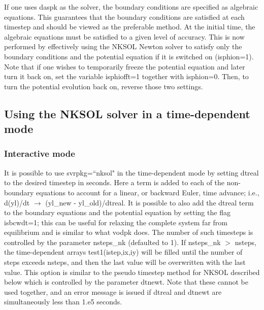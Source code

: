 \documentclass [12pt]{article}
\begin{document}
If one uses daspk as the solver, the boundary conditions are specified as
algebraic equations.  This guarantees that the boundary conditions are
satisfied at each timestep and should be viewed as the preferable method.
At the initial time, the algebraic equations must be satisfied to a given
level of accuracy.  This is now performed by effectively using the {\sf NKSOL}
Newton solver to satisfy only the boundary conditions and the potential
equation if it is switched on ({\sf isphion}=1). Note that if one wishes to
temporarily freeze the potential equation and later turn it back on, set the 
variable {\sf isphiofft}=1 together with {\sf isphion}=0.  Then, to turn the 
potential evolution back on, reverse those two settings.

\subsection{Using the {\sf NKSOL} solver in a time-dependent mode} 
\label{dtnksol}
\subsubsection{Interactive mode}
It is possible to use svrpkg=``nksol" in the time-dependent mode by setting
dtreal to the desired timestep in seconds.  Here a term is added to each of
the non-boundary equations to account for a linear, or backward Euler, time
advance; i.e., d(yl)/dt $\rightarrow$ ({\sf yl}\_new - yl\_old)/dtreal. It is
possible to also add the dtreal term to the boundary equations and the
potential equation by setting the flag isbcwdt=1; this can be useful for
relaxing the complete system far from equilibrium and is similar to what {\sf
vodpk} does.  The number of such timesteps is controlled by the parameter {\sf
nsteps\_nk} (defaulted to 1).  If {\sf nsteps\_nk} $>$ {\sf nsteps}, the
time-dependent arrays test1(istep,ix,iy) will be filled until the number of
steps exceeds {\sf nsteps}, and then the last value will be overwritten with
the last value.  This option is similar to the pseudo timestep method for {\sf
NKSOL} described below which is controlled by the parameter {\sf dtnewt}.
Note that these cannot be used together, and an error message is issued if
{\sf dtreal} and {\sf dtnewt} are simultaneously less than 1.e5 seconds.
\end{document}
